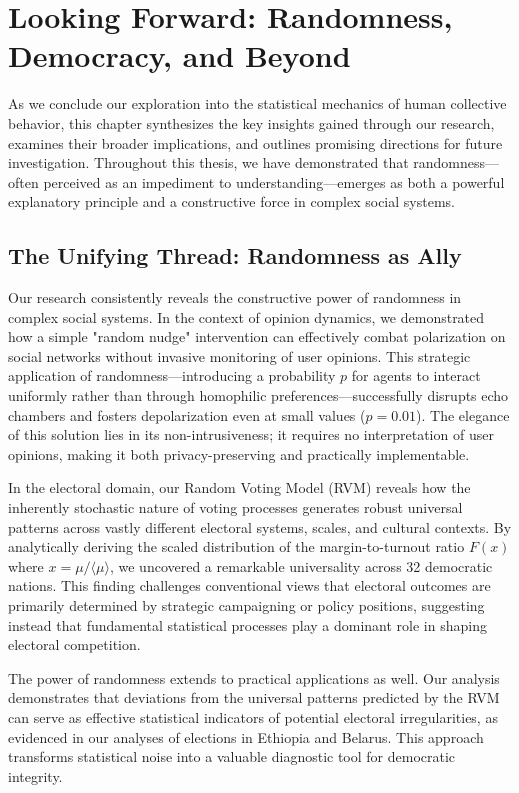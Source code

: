 \chapter{Looking Forward: Randomness, Democracy, and Beyond}
\label{chap7}

As we conclude our exploration into the statistical mechanics of human collective behavior, this chapter synthesizes the key insights gained through our research, examines their broader implications, and outlines promising directions for future investigation. Throughout this thesis, we have demonstrated that randomness—often perceived as an impediment to understanding—emerges as both a powerful explanatory principle and a constructive force in complex social systems.

\section{The Unifying Thread: Randomness as Ally}

Our research consistently reveals the constructive power of randomness in complex social systems. In the context of opinion dynamics, we demonstrated how a simple "random nudge" intervention can effectively combat polarization on social networks without invasive monitoring of user opinions. This strategic application of randomness—introducing a probability $p$ for agents to interact uniformly rather than through homophilic preferences—successfully disrupts echo chambers and fosters depolarization even at small values ($p = 0.01$). The elegance of this solution lies in its non-intrusiveness; it requires no interpretation of user opinions, making it both privacy-preserving and practically implementable.

In the electoral domain, our Random Voting Model (RVM) reveals how the inherently stochastic nature of voting processes generates robust universal patterns across vastly different electoral systems, scales, and cultural contexts. By analytically deriving the scaled distribution of the margin-to-turnout ratio $F(x)$ where $x = \mu/\langle\mu\rangle$, we uncovered a remarkable universality across 32 democratic nations. This finding challenges conventional views that electoral outcomes are primarily determined by strategic campaigning or policy positions, suggesting instead that fundamental statistical processes play a dominant role in shaping electoral competition.

The power of randomness extends to practical applications as well. Our analysis demonstrates that deviations from the universal patterns predicted by the RVM can serve as effective statistical indicators of potential electoral irregularities, as evidenced in our analyses of elections in Ethiopia and Belarus. This approach transforms statistical noise into a valuable diagnostic tool for democratic integrity.

